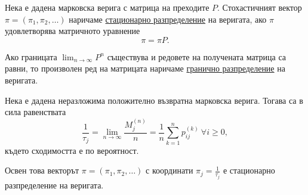 \documentclass[numbers=endperiod, DIV=15, bibliography=totocnumbered]{scrartcl}
\begin{document}
\begin{definition}
  Нека е дадена марковска верига с матрица на преходите $P$. Стохастичният вектор $\pi = (\pi_1, \pi_2, \ldots)$ наричаме \uline{стационарно разпределение} на веригата, ако $\pi$ удовлетворява матричното уравнение
  \begin{displaymath}
    \pi = \pi P.
  \end{displaymath}

  Ако границата $\lim_{n \to \infty} P^n$ съществува и редовете на получената матрица са равни, то произволен ред на матрицата наричаме \uline{гранично разпределение} на веригата.
\end{definition}

\begin{theorem}
  Нека е дадена неразложима положително възвратна марковска верига. Тогава са в сила равенствата
  \begin{displaymath}
    \frac 1 {\tau_j}
    =
    \lim_{n \to \infty} \frac {M^{(n)}_j} n
    =
     \frac 1 n \sum_{k=1}^n p_{ij}^{(k)}~\forall i \geq 0,
  \end{displaymath}
  където сходимостта е по вероятност.

  Освен това векторът $\pi = (\pi_1, \pi_2, \ldots)$ с координати $\pi_j = \frac 1 {\tau_j}$ е стационарно разпределение на веригата.
\end{theorem}
\end{document}
